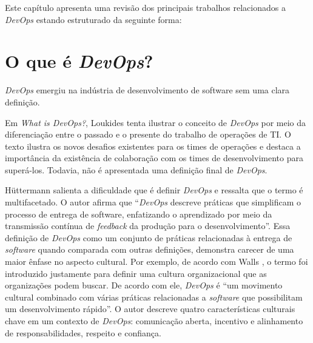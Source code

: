 \newcommand{\texCommand}[1]{\texttt{\textbackslash{#1}}}%

\newcommand{\exemplo}[1]{%
\vspace{\baselineskip}%
\noindent\fbox{\begin{minipage}{\textwidth}#1\end{minipage}}%
\\\vspace{\baselineskip}}%

\newcommand{\exemploVerbatim}[1]{%
\vspace{\baselineskip}%
\noindent\fbox{\begin{minipage}{\textwidth}%
#1\end{minipage}}%
\\\vspace{\baselineskip}}%

Este capítulo apresenta uma revisão dos principais trabalhos relacionados a
\textit{DevOps} estando estruturado da seguinte forma:

\section{O que é \textit{DevOps}?}

\textit{DevOps} emergiu na indústria de desenvolvimento de software sem uma
clara definição.

Em \textit{What is DevOps?}, Loukides tenta ilustrar o conceito de
\textit{DevOps} por meio da diferenciação entre o passado e o presente do
trabalho de operações de \acrshort{TI}. O texto ilustra os novos desafios
existentes para os times de operações e destaca a importância da existência
de colaboração com os times de desenvolvimento para superá-los. Todavia,
não é apresentada uma definição final de \textit{DevOps}.

H\"uttermann \cite{devops_for_developers} salienta a dificuldade que é definir
\textit{DevOps} e ressalta que o termo é multifacetado. O autor afirma que
``\textit{DevOps} descreve práticas que simplificam o processo de entrega
de software, enfatizando o aprendizado por meio da transmissão contínua de
\textit{feedback} da produção para o desenvolvimento''. Essa definição de
\textit{DevOps} como um conjunto de práticas relacionadas à entrega de
\textit{software} quando comparada com outras definições, demonstra carecer
de uma maior ênfase no aspecto cultural. Por exemplo, de acordo com
Walls \cite{building_devops_culture}, o termo foi introduzido justamente para
definir uma cultura organizacional que as organizações podem buscar. De acordo
com ele, \textit{DevOps} é ``um movimento cultural combinado com várias
práticas relacionadas a \textit{software} que possibilitam um desenvolvimento
rápido''. O autor descreve quatro características culturais chave em um
contexto de \textit{DevOps}: comunicação aberta, incentivo e alinhamento de
responsabilidades, respeito e confiança.






